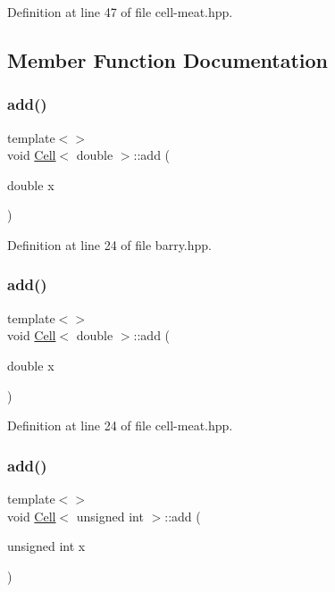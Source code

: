 Definition at line 47 of file cell-\/meat.\+hpp.



\subsection{Member Function Documentation}
\mbox{\label{class_cell_a64d4b92f322ccb8cfbad53f816d2caf8}} 
\subsubsection{\texorpdfstring{add()}{add()}\hspace{0.1cm}{\footnotesize\ttfamily [1/9]}}
{\footnotesize\ttfamily template$<$$>$ \\
void \hyperlink{class_cell}{Cell}$<$ double $>$\+::add (\begin{DoxyParamCaption}\item[{double}]{x }\end{DoxyParamCaption})\hspace{0.3cm}{\ttfamily [inline]}}



Definition at line 24 of file barry.\+hpp.

\mbox{\label{class_cell_a64d4b92f322ccb8cfbad53f816d2caf8}} 
\subsubsection{\texorpdfstring{add()}{add()}\hspace{0.1cm}{\footnotesize\ttfamily [2/9]}}
{\footnotesize\ttfamily template$<$$>$ \\
void \hyperlink{class_cell}{Cell}$<$ double $>$\+::add (\begin{DoxyParamCaption}\item[{double}]{x }\end{DoxyParamCaption})\hspace{0.3cm}{\ttfamily [inline]}}



Definition at line 24 of file cell-\/meat.\+hpp.

\mbox{\label{class_cell_ae22060201cf692bbf219827453d0acd2}} 
\subsubsection{\texorpdfstring{add()}{add()}\hspace{0.1cm}{\footnotesize\ttfamily [3/9]}}
{\footnotesize\ttfamily template$<$$>$ \\
void \hyperlink{class_cell}{Cell}$<$ unsigned int $>$\+::add (\begin{DoxyParamCaption}\item[{unsigned int}]{x }\end{DoxyParamCaption})\hspace{0.3cm}{\ttfamily [inline]}}



